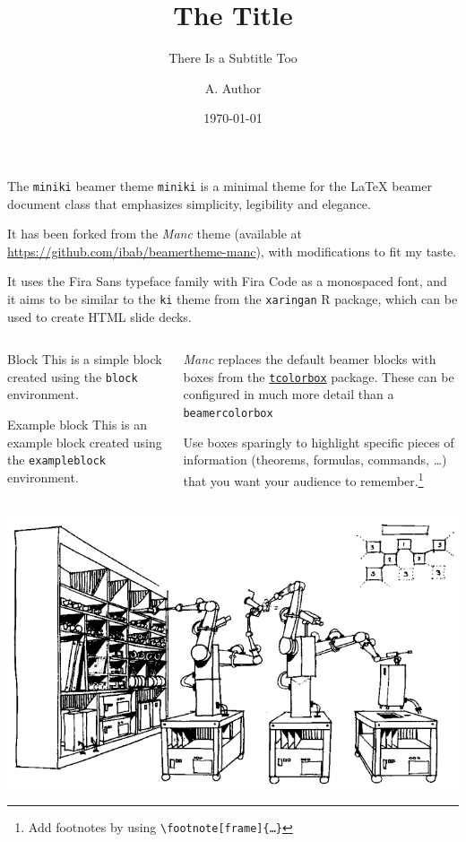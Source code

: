 \documentclass{beamer}
\title{The Title}
\subtitle{There Is a Subtitle Too}
\date{\today}
\author{A. Author}
\institute{Karolinska institutet}
\begin{document}
\begin{frame}
	\titlepage
\end{frame}

\begin{frame}{The \texttt{miniki} beamer theme}
	\texttt{miniki} is a minimal theme for the \LaTeX{} beamer document class that emphasizes simplicity, legibility and elegance.

	It has been forked from the \emph{Manc} theme (available at \url{https://github.com/ibab/beamertheme-manc}), with modifications to fit my taste.

	It uses the Fira Sans typeface family with Fira Code as a monospaced font, and it aims to be similar to the \texttt{ki} theme from the \texttt{xaringan} R package, which can be used to create HTML slide decks.
\end{frame}

\begin{frame}[fragile]
	\begin{columns}
		\begin{column}{0.5\textwidth}
			\begin{block}{Block}
				This is a simple block created using the \texttt{block} environment.
			\end{block}
			\begin{exampleblock}{Example block}
				This is an example block created using the \texttt{exampleblock} environment.
			\end{exampleblock}
		\end{column}
		\begin{column}{0.5\textwidth}
			\emph{Manc} replaces the default beamer blocks with boxes from the \href{https://www.ctan.org/pkg/tcolorbox}{\texttt{tcolorbox}} package.
			These can be configured in much more detail than a \texttt{beamercolorbox}
			\medskip

			Use boxes sparingly to highlight specific pieces of information (theorems, formulas, commands, …) that you want your audience to remember.\footnote[frame]{Add footnotes by using \texttt{\backslash footnote[frame]\{…\}}}
		\end{column}
	\end{columns}
\end{frame}

\begin{frame}
	\centering
	\includegraphics[width = \textwidth]{./graphics/self-replicating.png}
\end{frame}
\end{document}
